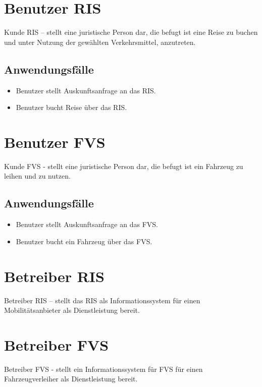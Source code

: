 \section{Benutzer RIS}
Kunde RIS – stellt eine juristische Person dar, die befugt ist eine Reise zu buchen und unter Nutzung der gewählten Verkehrsmittel, anzutreten. 

\subsection*{Anwendungsfälle}
\begin{itemize}
\item Benutzer stellt Auskunftsanfrage an das RIS.
\item Benutzer bucht Reise über das RIS.
\end{itemize}

\section{Benutzer FVS}
Kunde FVS - stellt eine juristische Person dar, die befugt ist ein Fahrzeug zu leihen und zu nutzen.

\subsection*{Anwendungsfälle}
\begin{itemize}
\item Benutzer stellt Auskunftsanfrage an das FVS.
\item Benutzer bucht ein Fahrzeug über das FVS.
\end{itemize}

\section{Betreiber RIS}
Betreiber RIS – stellt das RIS als Informationssystem für einen Mobilitätsanbieter als Dienstleistung bereit.


\section{Betreiber FVS}
Betreiber FVS - stellt ein Informationssystem für FVS für einen Fahrzeugverleiher als Dienstleistung bereit.

